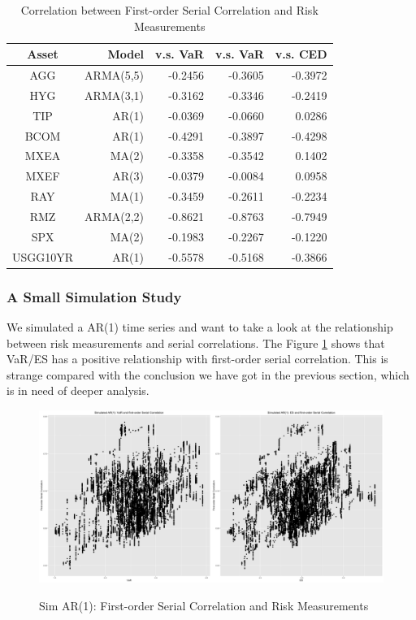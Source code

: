 \documentclass[12pt]{article}
\begin{document}
\begin{table}[!h]
\caption{Correlation between First-order Serial Correlation and Risk Measurements}
\centering 
\begin{tabular}{ | c || r | r | r | r |} 
 \hline
Asset& Model & v.s. VaR & v.s. VaR &v.s. CED\\
  \hline \hline
AGG &ARMA(5,5) &-0.2456 &  -0.3605&-0.3972 \\ 
HYG &ARMA(3,1) & -0.3162& -0.3346 & -0.2419 \\ 
TIP & AR(1)  &-0.0369 & -0.0660 & 0.0286 \\ 
BCOM &AR(1) & -0.4291&  -0.3897& -0.4298\\ 
MXEA & MA(2) &-0.3358&  -0.3542& 0.1402\\ 
MXEF & AR(3)  &-0.0379  &  -0.0084& 0.0958\\ 
RAY & MA(1) &-0.3459 &   -0.2611&  -0.2234\\ 
RMZ & ARMA(2,2) &-0.8621 &  -0.8763&  -0.7949\\ 
SPX & MA(2)  &-0.1983 &  -0.2267& -0.1220\\ 
USGG10YR &  AR(1) &-0.5578&  -0.5168& -0.3866\\
 \hline
\end{tabular}
\label{table:vsRiskMeasure}
\end{table}

\subsubsection{A Small Simulation Study}
We simulated a AR(1) time series and want to take a look at the relationship between risk measurements and serial correlations. The Figure \ref{fig:SimPart2} shows that VaR/ES has a positive relationship with first-order serial correlation. This is strange compared with the conclusion we have got in the previous section, which is in need of deeper analysis.
\begin{figure}
  \caption{Sim AR(1): First-order Serial Correlation and Risk Measurements}
  \includegraphics[width = \textwidth]{../figures/sim_part2}
  \label{fig:SimPart2}
\end{figure}
\end{document}

